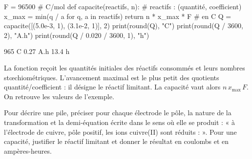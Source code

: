 \begin{codecote}[0.58]
\begin{pythoncol}
F = 96500                    # C/mol
def capacite(reactifs, n):
    # reactifs : (quantité, coefficient)
    x_max = min(q / a for q, a in reactifs)
    return n * x_max * F     # en C
Q = capacite([(5.0e-3, 1), (3.1e-2, 1)], 2)
print(round(Q), "C")
print(round(Q / 3600, 2), "A.h")
print(round(Q / 0.020 / 3600, 1), "h")
\end{pythoncol}
\begin{consolecol}
965 C
0.27 A.h
13.4 h
\end{consolecol}
\cote
\fontsize{9.5}{12.5}\selectfont
{}\par\smallskip
La fonction  reçoit les quantités initiales des réactifs consommés et leurs nombres stœchiométriques.
L'avancement maximal est le plus petit des quotients quantité/coefficient : il désigne le réactif limitant. La
capacité vaut alors $n\,x_{\max}\,F$. On retrouve les valeurs de l'exemple.
\end{codecote}
\begin{rediger}
Pour décrire une pile, préciser pour chaque électrode le pôle, la nature de la transformation et la demi-équation écrite
dans le sens où elle se produit : « à l'électrode de cuivre, pôle positif, les ions cuivre(II) sont réduits :
 ». Pour une capacité, justifier le réactif limitant et donner le résultat en coulombs et en
ampères-heures.
\end{rediger}
\exercices

